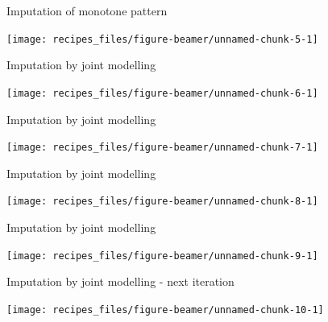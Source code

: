 \documentclass[ignorenonframetext,aspectratio=43]{beamer}
\begin{document}
\begin{frame}{Imputation of monotone pattern}

\begin{center}\texttt{[image: recipes\_files/figure-beamer/unnamed-chunk-5-1]} \end{center}

\end{frame}

\begin{frame}{Imputation by joint modelling}

\begin{center}\texttt{[image: recipes\_files/figure-beamer/unnamed-chunk-6-1]} \end{center}

\end{frame}

\begin{frame}{Imputation by joint modelling}

\begin{center}\texttt{[image: recipes\_files/figure-beamer/unnamed-chunk-7-1]} \end{center}

\end{frame}

\begin{frame}{Imputation by joint modelling}

\begin{center}\texttt{[image: recipes\_files/figure-beamer/unnamed-chunk-8-1]} \end{center}

\end{frame}

\begin{frame}{Imputation by joint modelling}

\begin{center}\texttt{[image: recipes\_files/figure-beamer/unnamed-chunk-9-1]} \end{center}

\end{frame}

\begin{frame}{Imputation by joint modelling - next iteration}

\begin{center}\texttt{[image: recipes\_files/figure-beamer/unnamed-chunk-10-1]} \end{center}

\end{frame}
\end{document}
